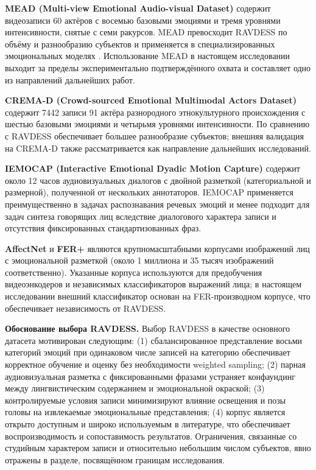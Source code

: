 \documentclass[a4paper, 12pt, oneside, openany]{article}
\begin{document}
\textbf{MEAD (Multi-view Emotional Audio-visual Dataset)} \cite{wang2020mead} содержит видеозаписи 60 актёров с восемью базовыми эмоциями и тремя уровнями интенсивности, снятые с семи ракурсов. MEAD превосходит RAVDESS по объёму и разнообразию субъектов и применяется в специализированных эмоциональных моделях \cite{ji2022eamm,wang2023eat}. Использование MEAD в настоящем исследовании выходит за пределы экспериментально подтверждённого охвата и составляет одно из направлений дальнейших работ.

\textbf{CREMA-D (Crowd-sourced Emotional Multimodal Actors Dataset)} \cite{cao2014cremad} содержит 7442 записи 91 актёра разнородного этнокультурного происхождения с шестью базовыми эмоциями и четырьмя уровнями интенсивности. По сравнению с RAVDESS обеспечивает большее разнообразие субъектов; внешняя валидация на CREMA-D также рассматривается как направление дальнейших исследований.

\textbf{IEMOCAP (Interactive Emotional Dyadic Motion Capture)} \cite{busso2008iemocap} содержит около 12 часов аудиовизуальных диалогов с двойной разметкой (категориальной и размерной), полученной от нескольких аннотаторов. IEMOCAP применяется преимущественно в задачах распознавания речевых эмоций и менее подходит для задач синтеза говорящих лиц вследствие диалогового характера записи и отсутствия фиксированных стандартизованных фраз.

\textbf{AffectNet} \cite{mollahosseini2017affectnet} и \textbf{FER+} \cite{barsoum2016ferplus} являются крупномасштабными корпусами изображений лиц с эмоциональной разметкой (около 1 миллиона и 35 тысяч изображений соответственно). Указанные корпуса используются для предобучения видеоэнкодеров и независимых классификаторов выражений лица; в настоящем исследовании внешний классификатор основан на FER-производном корпусе, что обеспечивает независимость от RAVDESS.

\textbf{Обоснование выбора RAVDESS.} Выбор RAVDESS в качестве основного датасета мотивирован следующим: (1) сбалансированное представление восьми категорий эмоций при одинаковом числе записей на категорию обеспечивает корректное обучение и оценку без необходимости weighted sampling; (2) парная аудиовизуальная разметка с фиксированными фразами устраняет конфаундинг между лингвистическим содержанием и эмоциональной окраской; (3) контролируемые условия записи минимизируют влияние освещения и позы головы на извлекаемые эмоциональные представления; (4) корпус является открыто доступным и широко используемым в литературе, что обеспечивает воспроизводимость и сопоставимость результатов. Ограничения, связанные со студийным характером записи и относительно небольшим числом субъектов, явно отражены в разделе, посвящённом границам исследования.
\end{document}
